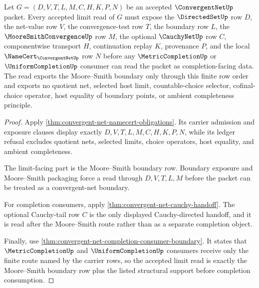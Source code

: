 \begin{theorem}
\label{thm:convergent-net-limit-handoff}
Let $G=(D,V,T,L,M,C,H,K,P,N)$ be an accepted $\ConvergentNetUp$ packet. Every accepted limit read of $G$ must expose the $\DirectedSetUp$ row $D$, the net-value row $V$, the convergence-test row $T$, the boundary row $L$, the $\MooreSmithConvergenceUp$ row $M$, the optional $\CauchyNetUp$ row $C$, componentwise transport $H$, continuation replay $K$, provenance $P$, and the local $\NameCert_{\ConvergentNetUp}$ row $N$ before any $\MetricCompletionUp$ or $\UniformCompletionUp$ consumer can read the packet as completion-facing data. The read exports the Moore--Smith boundary only through this finite row order and exports no quotient net, selected host limit, countable-choice selector, cofinal-choice operator, host equality of boundary points, or ambient completeness principle.
\end{theorem}
\begin{proof}
Apply \autoref{thm:convergent-net-namecert-obligations}. Its carrier admission and exposure clauses display exactly $D,V,T,L,M,C,H,K,P,N$, while its ledger refusal excludes quotient nets, selected limits, choice operators, host equality, and ambient completeness.

The limit-facing part is the Moore--Smith boundary row. Boundary exposure and Moore--Smith packaging force a read through $D,V,T,L,M$ before the packet can be treated as a convergent-net boundary.

For completion consumers, apply \autoref{thm:convergent-net-cauchy-handoff}. The optional Cauchy-tail row $C$ is the only displayed Cauchy-directed handoff, and it is read after the Moore--Smith route rather than as a separate completion object.

Finally, use \autoref{thm:convergent-net-completion-consumer-boundary}. It states that $\MetricCompletionUp$ and $\UniformCompletionUp$ consumers receive only the finite route named by the carrier rows, so the accepted limit read is exactly the Moore--Smith boundary row plus the listed structural support before completion consumption.
\end{proof}


